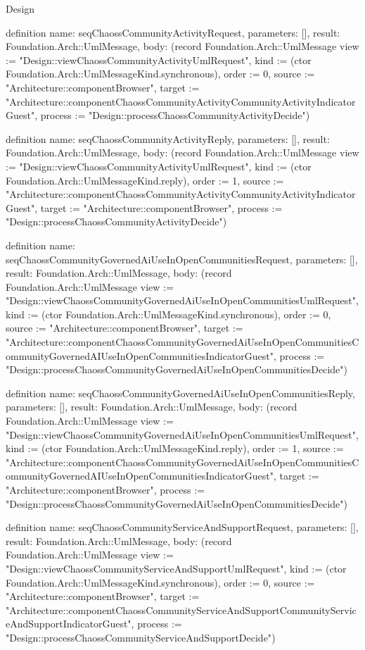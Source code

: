 \begin{lexlean}{Design}
\begin{semanticmodule}
definition{
  name: seqChaossCommunityActivityRequest,
  parameters: [],
  result: Foundation.Arch::UmlMessage,
  body: (record Foundation.Arch::UmlMessage {view := "Design::viewChaossCommunityActivityUmlRequest", kind := (ctor Foundation.Arch::UmlMessageKind.synchronous), order := 0, source := "Architecture::componentBrowser", target := "Architecture::componentChaossCommunityActivityCommunityActivityIndicatorGuest", process := "Design::processChaossCommunityActivityDecide"})
}

definition{
  name: seqChaossCommunityActivityReply,
  parameters: [],
  result: Foundation.Arch::UmlMessage,
  body: (record Foundation.Arch::UmlMessage {view := "Design::viewChaossCommunityActivityUmlRequest", kind := (ctor Foundation.Arch::UmlMessageKind.reply), order := 1, source := "Architecture::componentChaossCommunityActivityCommunityActivityIndicatorGuest", target := "Architecture::componentBrowser", process := "Design::processChaossCommunityActivityDecide"})
}

definition{
  name: seqChaossCommunityGovernedAiUseInOpenCommunitiesRequest,
  parameters: [],
  result: Foundation.Arch::UmlMessage,
  body: (record Foundation.Arch::UmlMessage {view := "Design::viewChaossCommunityGovernedAiUseInOpenCommunitiesUmlRequest", kind := (ctor Foundation.Arch::UmlMessageKind.synchronous), order := 0, source := "Architecture::componentBrowser", target := "Architecture::componentChaossCommunityGovernedAiUseInOpenCommunitiesCommunityGovernedAIUseInOpenCommunitiesIndicatorGuest", process := "Design::processChaossCommunityGovernedAiUseInOpenCommunitiesDecide"})
}

definition{
  name: seqChaossCommunityGovernedAiUseInOpenCommunitiesReply,
  parameters: [],
  result: Foundation.Arch::UmlMessage,
  body: (record Foundation.Arch::UmlMessage {view := "Design::viewChaossCommunityGovernedAiUseInOpenCommunitiesUmlRequest", kind := (ctor Foundation.Arch::UmlMessageKind.reply), order := 1, source := "Architecture::componentChaossCommunityGovernedAiUseInOpenCommunitiesCommunityGovernedAIUseInOpenCommunitiesIndicatorGuest", target := "Architecture::componentBrowser", process := "Design::processChaossCommunityGovernedAiUseInOpenCommunitiesDecide"})
}

definition{
  name: seqChaossCommunityServiceAndSupportRequest,
  parameters: [],
  result: Foundation.Arch::UmlMessage,
  body: (record Foundation.Arch::UmlMessage {view := "Design::viewChaossCommunityServiceAndSupportUmlRequest", kind := (ctor Foundation.Arch::UmlMessageKind.synchronous), order := 0, source := "Architecture::componentBrowser", target := "Architecture::componentChaossCommunityServiceAndSupportCommunityServiceAndSupportIndicatorGuest", process := "Design::processChaossCommunityServiceAndSupportDecide"})
}


\end{semanticmodule}
\end{lexlean}
